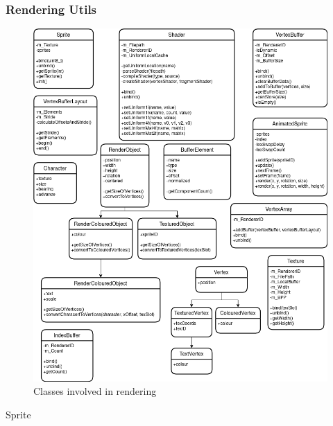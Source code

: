 \documentclass{article}
\begin{document}
            \subsubsection{Rendering Utils}
                \begin{figure}[hbt!]
                    \centerline{\includegraphics[scale=0.5]{img/Classes/Rendering Utils.png}}
                    \caption{Classes involved in rendering}
                    \label{fig}
                \end{figure}
                Sprite
\end{document}
